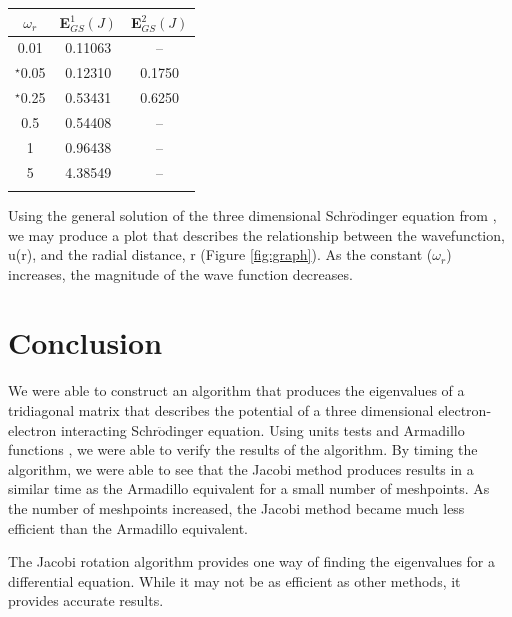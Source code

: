 \documentclass[%
reprint,
superscriptaddress,
showpacs,
nofootinbib,
bibnotes,amsmath,amssymb,aps,
prc, 
]{revtex4-1}
\begin{document}
	
	
	\begin{center}
		\begin{tabular}{ccc}
			\hline \hline
			$\omega_{r}$ &  E$_{GS}^{1} (J)$ & E$_{GS}^{2} (J)$ \cite{PhysRevA.48.3561}\\
			\hline
			0.01 & 0.11063 & -- \\
			$^{\star}$0.05 & 0.12310 & 0.1750\\
			$^{\star}$0.25 & 0.53431 & 0.6250\\
			0.5 & 0.54408 & --\\
			1 & 0.96438 & -- \\
			5 & 4.38549 & --\\
			\hline
			\label{StateTable}
		\end{tabular}
	\end{center}

	Using the general solution of the three dimensional Schr$\ddot{\textrm{o}}$dinger equation from \cite{PhysRevA.48.3561}, we may produce a plot that describes the relationship between the wavefunction, u(r), and the radial distance, r (Figure \ref{fig:graph}).  As the constant ($\omega_{r}$) increases, the magnitude of the wave function decreases.
	
	




\section{Conclusion}

We were able to construct an algorithm that produces the eigenvalues of a tridiagonal matrix that describes the potential of a three dimensional electron-electron interacting Schr$\ddot{\textrm{o}}$dinger equation.  Using units tests and Armadillo functions \cite{Armadillo}, we were able to verify the results of the algorithm.  By timing the algorithm, we were able to see that the Jacobi method produces results in a similar time as the Armadillo equivalent for a small number of meshpoints.  As the number of meshpoints increased, the Jacobi method became much less efficient than the Armadillo equivalent.

The Jacobi rotation algorithm provides one way of finding the eigenvalues for a differential equation.  While it may not be as efficient as other methods, it provides accurate results.


	
	
	
	
		
	
	
	
\end{document}
